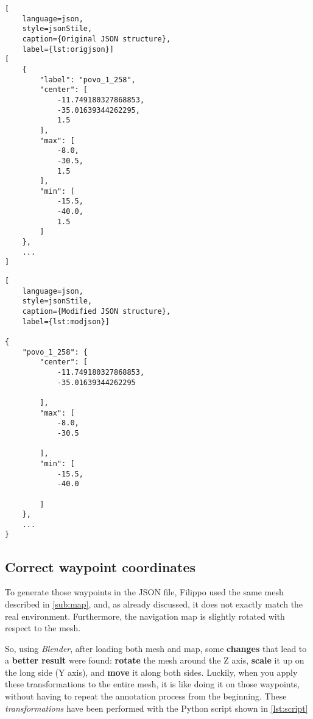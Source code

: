 \noindent\begin{minipage}{0.425\textwidth}
\noindent\begin{lstlisting}[
    language=json,
    style=jsonStile,
    caption={Original JSON structure},
    label={lst:origjson}]
[
    {
        "label": "povo_1_258",
        "center": [
            -11.749180327868853,
            -35.01639344262295,
            1.5
        ],
        "max": [
            -8.0,
            -30.5,
            1.5
        ],
        "min": [
            -15.5,
            -40.0,
            1.5
        ]
    },
    ...
]
\end{lstlisting}
\end{minipage}
\noindent\begin{minipage}{0.15\textwidth}
    \centering
    \noindent{}
\end{minipage}
\noindent\begin{minipage}{0.425\textwidth}
\noindent\begin{lstlisting}[
    language=json,
    style=jsonStile,
    caption={Modified JSON structure},
    label={lst:modjson}]

{
    "povo_1_258": {
        "center": [
            -11.749180327868853,
            -35.01639344262295

        ],
        "max": [
            -8.0,
            -30.5

        ],
        "min": [
            -15.5,
            -40.0

        ]
    },
    ...
}
\end{lstlisting}
\end{minipage}


\subsection{Correct waypoint coordinates}
\label{sub:waypoints}

To generate those waypoints in the JSON file, Filippo used the same mesh described in \autoref{sub:map}, and, as already discussed, it does not exactly match the real environment. Furthermore, the navigation map is slightly rotated with respect to the mesh.

So, using \textit{Blender}\cite{blender}, after loading both mesh and map, some \textbf{changes} that lead to a \textbf{better result} were found: \textbf{rotate} the mesh around the Z axis, \textbf{scale} it up on the long side (Y axis), and \textbf{move} it along both sides. Luckily, when you apply these transformations to the entire mesh, it is like doing it on those waypoints, without having to repeat the annotation process from the beginning. These \textit{transformations} have been performed with the Python script shown in \autoref{lst:script}

